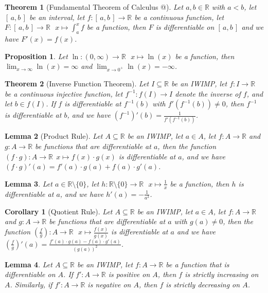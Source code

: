 \documentclass[11pt]{article}
\makeatletter
\theoremstyle{break}
\theoremstyle{break}
\newtheorem{thm}{Theorem}[section]
\newtheorem{lem}{Lemma}[thm]
\newtheorem{prop}[lem]{Proposition}
\newtheorem{corL}{Corollary}[lem]
\newcommand{\R}{\mathbb{R}}
\newcommand{\Intab}{[\,a,b\,]}
\newcommand*{\rom}[1]{\expandafter\@slowromancap\romannumeral #1@}
\makeatother
\begin{document}
	\begin{thm}[Fundamental Theorem of Calculus \rom{1}]
		Let $a,b \in \R$ with $a<b$, let $\Intab$ be an interval, let $f:\Intab \to \R$ be a continuous function, let $F:\Intab \to \R \ \ \ x \mapsto \int_a^x f$ be a function, then $F$ is differentiable on $\Intab$ and we have $F'(x)=f(x)$.
	\end{thm}

	\begin{prop}
		Let $\ln:(0,\infty) \to \R \ \ \ x \mapsto \ln(x)$ be a function, then $\lim_{x \to \infty}\ln(x)=\infty$ and $\lim_{x \to 0^+}\ln(x)=-\infty$.
	\end{prop}	
	
	\begin{thm}[Inverse Function Theorem]
		Let $I \subseteq \R$ be an IWIMP, let $f:I \to \R$ be a continuous injective function, let $f^{-1}:f(I) \to I$ denote the inverse of $f$, and let $b \in f(I)$. If $f$ is differentiable at $f^{-1}(b)$ with $f'(f^{-1}(b)) \neq 0$, then $f^{-1}$ is differentiable at $b$, and we have $(f^{-1})'(b)=\frac{1}{f'(f^{-1}(b))}$.
	\end{thm}
	
	\begin{lem}[Product Rule]
		Let $A \subseteq \R$ be an IWIMP, let $a \in A$, let $f:A \to \R$ and $g:A \to \R$ be functions that are differentiable at $a$, then the function $(f \cdot g):A \to \R \ \ x \mapsto f(x) \cdot g(x)$ is differentiable at $a$, and we have $(f \cdot g)'(a)=f'(a) \cdot g(a) +f(a) \cdot g'(a)$.
	\end{lem}	
	
	\begin{lem}
		Let $a \in \R \setminus \{ 0 \}$, let $h:\R \setminus \{ 0 \} \to \R \ \ \ x \mapsto \frac{1}{x}$ be a function, then $h$ is differentiable at $a$, and we have $h'(a)=- \frac{1}{a^2}$.
	\end{lem}
	
	\begin{corL}[Quotient Rule]
		Let $A \subseteq \R$ be an IWIMP, let $a \in A$, let $f:A \to \R$ and $g:A \to \R$ be functions that are differentiable at $a$ with $g(a) \neq 0$, then the function $(\frac{f}{g}):A \to \R \ \ \ x \mapsto \frac{f(x)}{g(x)}$ is differentiable at $a$ and we have $(\frac{f}{g})'(a) = \frac{f'(a)\cdot g(a)-f(a) \cdot g'(a)}{(g(a))^2}$.
	\end{corL} 
	
	\begin{lem}
		Let $A \subseteq \R$ be an IWIMP, let $f:A \to \R$ be a function that is differentiable on $A$. If $f':A \to \R$ is positive on $A$, then $f$ is strictly increasing on $A$. Similarly, if $f':A \to \R$ is negative on $A$, then $f$ is strictly decreasing on $A$.
	\end{lem}
	
\end{document}
